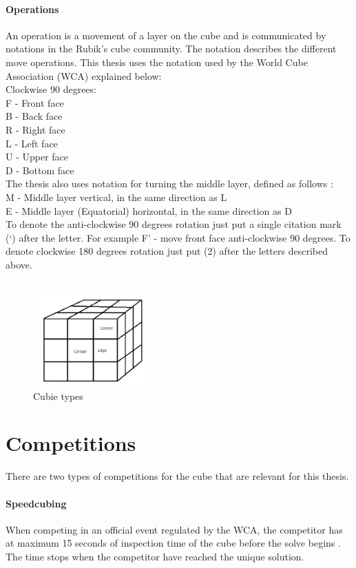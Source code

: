 \documentclass[a4paper,11pt]{kth-mag}
\begin{document}
\paragraph{Operations}
An operation is a movement of a layer on the cube and is communicated by notations in the Rubik's cube community. The notation describes the different move operations. This thesis uses the notation used by the World Cube Association (WCA) \cite{WCA1} explained below:\\
Clockwise 90 degrees:\\
F - Front face\\
B - Back face\\
R - Right face\\
L - Left face\\
U - Upper face\\
D - Bottom face\\
The thesis also uses notation for turning the middle layer, defined as follows \cite{Ruwix}:\\
M - Middle layer vertical, in the same direction as L\\
E - Middle layer (Equatorial) horizontal, in the same direction as D\\
To denote the anti-clockwise 90 degrees rotation just put a single citation mark (‘) after the letter. For example F’ - move front face anti-clockwise 90 degrees.
To denote clockwise 180 degrees rotation just put (2) after the letters described above.\\\\


\begin{figure}[b]
	\centering
	\includegraphics[width= 0.4\textwidth]{figs/representation.png}
	\caption{Cubie types}
	\label{fig_3}
\end{figure}
\section{Competitions}
There are two types of competitions for the cube that are relevant for this thesis.
\paragraph{Speedcubing}
When competing in an official event regulated by the WCA, the competitor has at maximum 15 seconds of inspection time of the cube before the solve begins \cite{WCA2}. The time stops when the competitor have reached the unique solution. 
\end{document}
